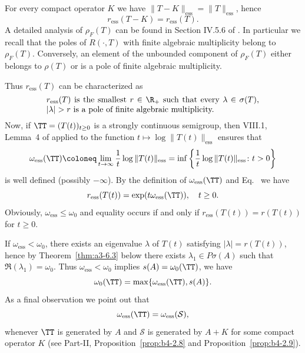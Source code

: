\begin{example}
For every compact operator $K$ we have $\|T - K\|_{\text{ess}} = \|T\|_{\text{ess}}$, hence
\begin{equation}\label{eq:a3-3.7}
r_{\text{ess}}(T - K) = r_{\text{ess}}(T) .
\end{equation}
A detailed analysis of\/ $\rho_{F}(T)$ can be found in Section IV.5.6 of \textcite{kato:1976}.
In particular we recall that the poles 
of\/ $R(\cdot,T)$ with finite algebraic multiplicity belong to $\rho_{F}(T)$.
Conversely, an element of the unbounded component of\/ $\rho_{F}(T)$ either belongs to $\rho(T)$ or is a pole of finite algebraic multiplicity.

Thus $r_{\text{ess}}(T)$ can be characterized as
\begin{equation}\label{eq:a3-3.8}
\begin{minipage}{.75\textwidth}
$r_{\text{ess}}(T) $ is the smallest   $r \in \R_{+}$    such that every   
$\lambda \in \sigma(T)$, $ |\lambda| > r $  is a pole of finite algebraic multiplicity. 
\end{minipage}
\end{equation}
Now, if\/ $\TT = (T(t))_{t \geq 0}$ is a strongly continuous semigroup, then VIII.1, Lemma~4 of \textcite{dunfordschwartz:1958} applied to the function $t \mapsto \log \|T(t)\|_{\text{ess}}$ ensures that
\begin{equation}\label{eq:a3-3.9}
\omega_{\text{ess}}(\TT) \coloneq \lim_{t \to \infty} \frac{1}{t} \log\|T(t)\|_{\text{ess}} = \inf \left\{\frac{1}{t} \log\|T(t)\|_{\text{ess}} \colon t > 0\right\}
\end{equation}
is well defined (possibly $-\infty$).
By the definition of\/ $\omega_{\text{ess}}(\TT)$ and Eq.~ we have
\begin{equation}\label{eq:a3-3.10}
r_{\text{ess}}(T(t)) = \exp(t\omega_{\text{ess}}(\TT)), \quad t \geq 0 .
\end{equation}
Obviously, $\omega_{\text{ess}} \leq \omega_{0}$ and equality occurs if and only if\/ $r_{\text{ess}}(T(t)) = r(T(t))$ for $t \geq 0$.

If\/ $\omega_{\text{ess}} < \omega_{0}$, there exists an eigenvalue $\lambda$ of\/ $T(t)$ satisfying $|\lambda| = r(T(t))$, hence by Theorem~\ref{thm:a3-6.3} below there exists $\lambda_{1} \in P\sigma(A)$ such that $\Re(\lambda_{1}) = \omega_{0}$.
Thus $\omega_{\text{ess}} < \omega_{0}$ implies $s(A) = \omega_{0}(\TT)$, \ie we have
\begin{equation}\label{eq:a3-3.11}
\omega_{0}(\TT) = \max\{\omega_{\text{ess}}(\TT),s(A)\} .
\end{equation}
As a final observation we point out that
\begin{equation}\label{eq:a3-3.12}
\omega_{\text{ess}}(\TT) = \omega_{\text{ess}}({\mathcal{S}}) ,
\end{equation}
whenever $\TT$ is generated by $A$ and $\mathcal{S}$ is generated by $A + K$ for some compact operator $K$ 
(see Part-II, Proposition~\ref{prop:b4-2.8} and Proposition~\ref{prop:b4-2.9}).
\end{example}
